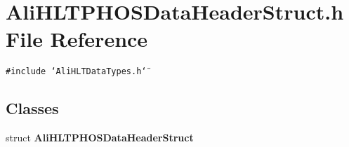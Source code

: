 \section{Ali\-HLTPHOSData\-Header\-Struct.h File Reference}
\label{AliHLTPHOSDataHeaderStruct_8h}


{\tt \#include \char`\"{}Ali\-HLTData\-Types.h\char`\"{}}\par
\subsection*{Classes}
\begin{CompactItemize}
\item 
struct {\bf Ali\-HLTPHOSData\-Header\-Struct}
\end{CompactItemize}
